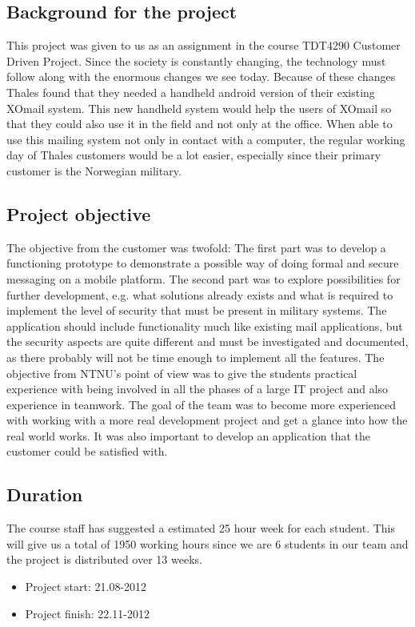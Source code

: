 \subsection{Background for the project}
This project was given to us as an assignment in the course TDT4290 Customer Driven Project. Since the society is constantly changing, the technology must follow along with the enormous changes we see today. Because of these changes Thales found that they needed a handheld android version of their existing XOmail system. This new handheld system would help the users of XOmail so that they could also use it in the field and not only at the office. When able to use this mailing system not only in contact with a computer, the regular working day of Thales customers would be a lot easier, especially since their primary customer is the Norwegian military.

\subsection{Project objective}
The objective from the customer was twofold: The first part was to develop a functioning prototype to demonstrate a possible way of doing formal and secure messaging on a mobile platform. The second part was to explore possibilities for further development, e.g. what solutions already exists and what is required to implement the level of security that must be present in military systems. The application should include functionality much like existing mail applications, but the security aspects are quite different and must be investigated and documented, as there probably will not be time enough to implement all the features.
The objective from NTNU’s point of view was to give the students practical experience with being involved in all the phases of a large IT project and also experience in teamwork. 
The goal of the team was to become more experienced with working with a more real development project and get a glance into how the real world works. It was also important to develop an application that the customer could be satisfied with. 


\subsection{Duration}
The course staff has suggested a estimated 25 hour week for each student. This will give us a total of 1950 working hours since we are 6 students in our team and the project is distributed over 13 weeks.

\begin{itemize}
\item{}Project start: 21.08-2012
\item{}Project finish: 22.11-2012
\end{itemize}

